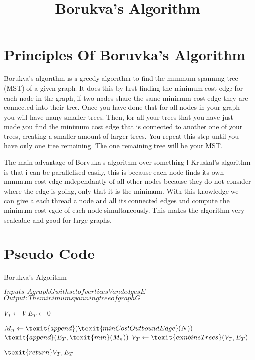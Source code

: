 \documentclass{report}
\title{Borukva's Algorithm}
\author{}
\begin{document}
\maketitle

\section{Principles Of Boruvka's Algorithm}
Borukva's algorithm is a greedy algorithm to find the minimum spanning tree (MST) of a given graph.
It does this by first finding the minimum cost edge for each node in the graph, if two nodes share the same minimum cost edge they are connected into their tree.
Once you have done that for all nodes in your graph you will have many smaller trees.
Then, for all your trees that you have just made you find the minimum cost edge that is connected to another one of your trees, creating a smaller amount of larger trees.
You repeat this step until you have only one tree remaining.
The one remaining tree will be your MST.

The main advantage of Borvuka's algorithm over something l Kruskal's algorithm is that i can be parallelised easily, this is because each node finds its own minimum cost edge independantly of all other nodes because they do not consider where the edge is going, only that it is the minimum.
With this knowledge we can give a each thread a node and all its connected edges and compute the minimum cost egde of each node simultaneously.
This makes the algorithm very scaleable and good for large graphs.

\section{Pseudo Code}

\caption{Borukva's Algorithm}

\begin{algorithmic}
    \State $ Inputs: A graph G with set of vertices V and edges E $
    \State $ Output: The minimum spanning tree of graph G $

    \State $ V_{T} \gets V $
    \State $ E_{T} \gets 0 $
    
                \State $ M_{n} \gets \texit{append}(\texit{minCostOutboundEdge}(N)) $
            \EndFor
            \State $ \texit{append}(E_{T}, \texit{min}(M_{n})) $
        \State $ V_{T} \gets \texit{combineTrees}(V_{T}, E_{T}) $
        \EndFor
    \EndWhile

    \State $ \texit{return} V_{T}, E_{T} $
\end{algorithmic}
\end{document}
